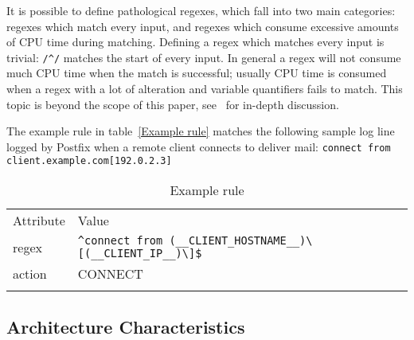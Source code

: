 \documentclass{svmult}
\newcommand{\tabletopline}[0]{%
    \hline%
    \noalign{\smallskip}%
}
\newcommand{\tablebottomline}[0]{%
    \noalign{\smallskip}%
    \hline%
}
\newcommand{\tablemiddleline}[0]{%
    \noalign{\smallskip}%
    \hline%
    \noalign{\smallskip}%
}
\newcommand{\refwithlabel}[2]{%
    #1~\vref{#2}%
}
\newcommand{\tableref}[1]{%
    \refwithlabel{table}{#1}%
}
\newcommand{\daemon}[1]{%
    \texttt{postfix/#1}%
}
\newcommand{\tab}[0]{%
    \hspace*{2em}%
}
\begin{document}
It is possible to define pathological regexes, which fall into two main
categories: regexes which match every input, and regexes which consume
excessive amounts of CPU time during matching.  Defining a regex which
matches every input is trivial: \verb!/^/! matches the start of every
input.  In general a regex will not consume much CPU time when the match is
successful; usually CPU time is consumed when a regex with a lot of
alteration and variable quantifiers fails to match.  This topic is beyond
the scope of this paper, see~\cite{mastering-regular-expressions} for
in-depth discussion.

The example rule in \tableref{Example rule} matches the following sample
log line logged by Postfix when a remote client connects to deliver mail:
\newline{}\tab{}\verb!connect from client.example.com[192.0.2.3]!

\begin{table}[htbp]
    \caption{Example rule}
    \empty{}\label{Example rule}
    \begin{tabular}[]{ll}
        \tabletopline{}%
        Attribute                 & Value                                            \\
        \tablemiddleline{}%
        regex                     & \verb!^connect from (__CLIENT_HOSTNAME__)\[(__CLIENT_IP__)\]$! \\
        action                    & CONNECT                                          \\
        \tablebottomline{}%
    \end{tabular}
\end{table}

\subsection{Architecture Characteristics}

\label{Architecture characteristics}
\end{document}
